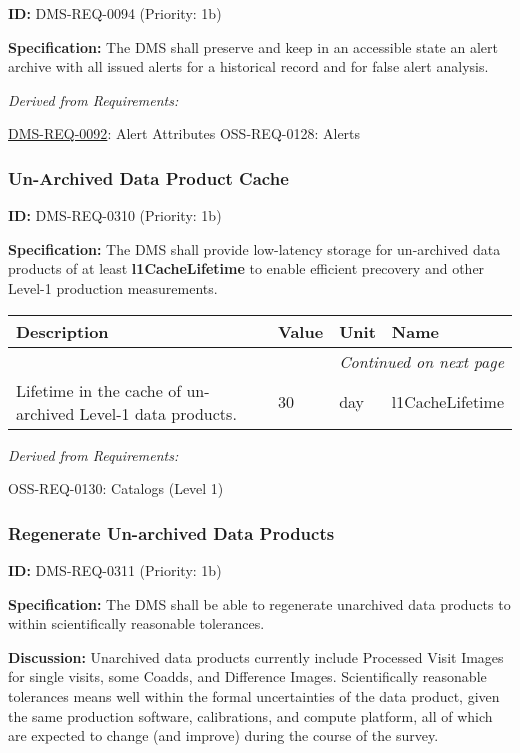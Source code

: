 \documentclass[SE,toc,lsstdraft]{lsstdoc}
\makeatletter
\newcommand{\paramname}[1]{\hspace{0pt}#1}
\newcommand{\unitname}[1]{\hspace{0pt}#1}
\newenvironment{parameters}[0]{%
\setlength\LTleft{0pt}
\setlength\LTright{\fill}
\begin{small}
\begin{longtable}[]{|p{0.49\textwidth}|l|p{0.6in}|p{1.70in}@{}|}

\hline \textbf{Description} & \textbf{Value} & \textbf{Unit} & \textbf{Name} \\ \hline
\endhead

\hline \multicolumn{4}{r}{\emph{Continued on next page}} \\
\endfoot

\hline\hline
\endlastfoot
}{%
\hline
\end{longtable}
\end{small}
}
\makeatother
\begin{document}
\label{DMS-REQ-0094}
\textbf{ID:} DMS-REQ-0094 (Priority: 1b)

\textbf{Specification: }The DMS shall preserve and keep in an accessible state an alert archive with all issued alerts for a historical record and for false alert analysis.

\emph{Derived from Requirements:}

\hyperref[DMS-REQ-0092]{DMS-REQ-0092}:
Alert Attributes \newline
OSS-REQ-0128:
Alerts \newline

\subsubsection{Un-Archived Data Product Cache}

\label{DMS-REQ-0310}
\textbf{ID:} DMS-REQ-0310 (Priority: 1b)

\textbf{Specification:} The DMS shall provide low-latency storage for un-archived data products of at least \textbf{l1CacheLifetime }to enable efficient precovery and other Level-1 production measurements.

\begin{parameters}
Lifetime in the cache of un-archived Level-1 data products.
&
30
&
\unitname{%
day
}
&
\paramname{%
l1CacheLifetime
} \\\hline
\end{parameters}

\emph{Derived from Requirements:}

OSS-REQ-0130:
Catalogs (Level 1) \newline

\subsubsection{Regenerate Un-archived Data Products}

\label{DMS-REQ-0311}
\textbf{ID:} DMS-REQ-0311 (Priority: 1b)

\textbf{Specification:} The DMS shall be able to regenerate unarchived data products to within scientifically reasonable tolerances.

\textbf{Discussion: }Unarchived data products currently include Processed Visit Images for single visits, some Coadds, and Difference Images. Scientifically reasonable tolerances means well within the formal uncertainties of the data product, given the same production software, calibrations, and compute platform, all of which are expected to change (and improve) during the course of the survey.
\end{document}
